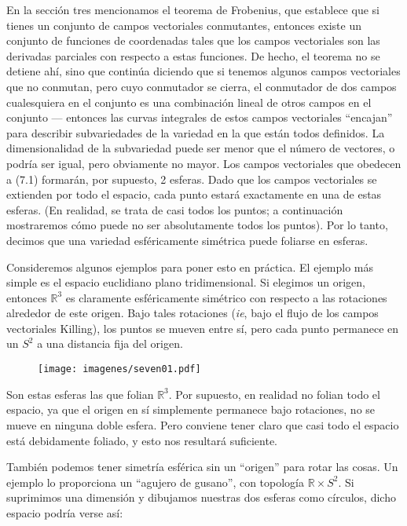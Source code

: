 \documentclass[11pt,b5paper,openany,twoside]{book}
\newcommand{\R}{\mathbb{R}}
\begin{document}
En la sección tres mencionamos el teorema de Frobenius, que establece que si tienes un conjunto de campos vectoriales conmutantes, entonces existe un conjunto de funciones de coordenadas tales que los campos vectoriales son las derivadas parciales con respecto a estas funciones.
De hecho, el teorema no se detiene ahí, sino que continúa diciendo que si tenemos algunos campos vectoriales que no conmutan, pero cuyo conmutador se cierra, el conmutador de dos campos cualesquiera en el conjunto es una combinación lineal de otros campos en el conjunto --- entonces las curvas integrales de estos campos vectoriales ``encajan'' para describir subvariedades de la variedad en la que están todos definidos.
La dimensionalidad de la subvariedad puede ser menor que el número de vectores, o podría ser igual, pero obviamente no mayor.
Los campos vectoriales que obedecen a (7.1) formarán, por supuesto, 2 esferas.
Dado que los campos vectoriales se extienden por todo el espacio, cada punto estará exactamente en una de estas esferas.
(En realidad, se trata de casi todos los puntos; a continuación mostraremos cómo puede no ser absolutamente todos los puntos).
Por lo tanto, decimos que una variedad esféricamente simétrica puede foliarse en esferas.

Consideremos algunos ejemplos para poner esto en práctica.
El ejemplo más simple es el espacio euclidiano plano tridimensional.
Si elegimos un origen, entonces $\R^3$ es claramente esféricamente simétrico con respecto a las rotaciones alrededor de este origen.
Bajo tales rotaciones ({\it ie}, bajo el flujo de los campos vectoriales Killing), los puntos se mueven entre sí, pero cada punto permanece en un $S^2$ a una distancia fija del origen.

\begin{figure}[h]
\centering
\texttt{[image: imagenes/seven01.pdf]}
\end{figure}

\noindent
Son estas esferas las que folian $\R^3$.
Por supuesto, en realidad no folian todo el espacio, ya que el origen en sí simplemente permanece bajo rotaciones, no se mueve en ninguna doble esfera.
Pero conviene tener claro que casi todo el espacio está debidamente foliado, y esto nos resultará suficiente.

También podemos tener simetría esférica sin un ``origen'' para rotar las cosas.
Un ejemplo lo proporciona un ``agujero de gusano'', con topología $\R\times S^2$.
Si suprimimos una dimensión y dibujamos nuestras dos esferas como círculos, dicho espacio podría verse así:
\end{document}
